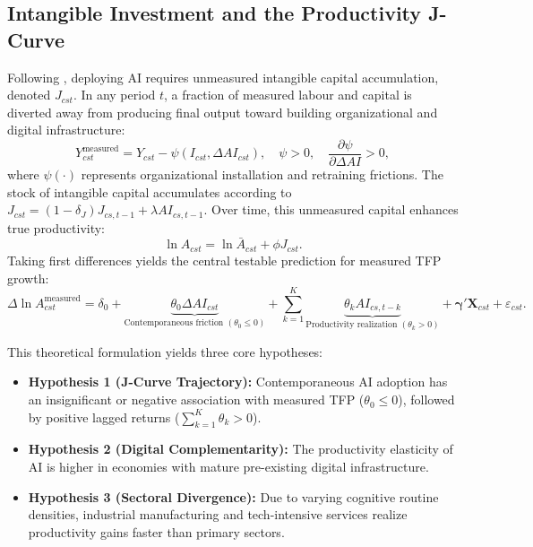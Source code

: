 \documentclass[11pt,a4paper]{article}
\begin{document}
\subsection{Intangible Investment and the Productivity J-Curve}
Following \citet{brynjolfsson2021}, deploying AI requires unmeasured intangible capital accumulation, denoted $J_{cst}$. In any period $t$, a fraction of measured labour and capital is diverted away from producing final output toward building organizational and digital infrastructure:
\begin{equation}
    Y_{cst}^{\text{measured}} = Y_{cst} - \psi(I_{cst}, \Delta AI_{cst}), \quad \psi > 0, \quad \frac{\partial \psi}{\partial \Delta AI} > 0,
\end{equation}
where $\psi(\cdot)$ represents organizational installation and retraining frictions. The stock of intangible capital accumulates according to $J_{cst} = (1 - \delta_J) J_{cs,t-1} + \lambda AI_{cs,t-1}$. Over time, this unmeasured capital enhances true productivity:
\begin{equation}
    \ln A_{cst} = \ln \bar{A}_{cst} + \phi J_{cst}.
\end{equation}
Taking first differences yields the central testable prediction for measured TFP growth:
\begin{equation}
    \Delta \ln A_{cst}^{\text{measured}} = \delta_0 + \underbrace{\theta_0 \Delta AI_{cst}}_{\text{Contemporaneous friction } (\theta_0 \le 0)} + \sum_{k=1}^{K} \underbrace{\theta_k AI_{cs,t-k}}_{\text{Productivity realization } (\theta_k > 0)} + \bm{\gamma}' \mathbf{X}_{cst} + \varepsilon_{cst}.
    \label{eq:jcurve_hyp}
\end{equation}

This theoretical formulation yields three core hypotheses:
\begin{itemize}
    \item \textbf{Hypothesis 1 (J-Curve Trajectory):} Contemporaneous AI adoption has an insignificant or negative association with measured TFP ($\theta_0 \le 0$), followed by positive lagged returns ($\sum_{k=1}^K \theta_k > 0$).
    \item \textbf{Hypothesis 2 (Digital Complementarity):} The productivity elasticity of AI is higher in economies with mature pre-existing digital infrastructure.
    \item \textbf{Hypothesis 3 (Sectoral Divergence):} Due to varying cognitive routine densities, industrial manufacturing and tech-intensive services realize productivity gains faster than primary sectors.
\end{itemize}
\end{document}
